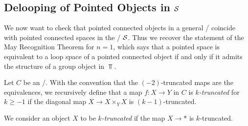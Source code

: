 \subsection*{Delooping of Pointed Objects in $\mathcal{S}$}
We now want to check that pointed connected objects in a general \inftytop/ coincide with pointed connected spaces in the \inftytop/ $\mathcal{S}$.
Thus we recover the statement of the May Recognition Theorem for $n=1$, which says that a pointed space is equivalent to a loop space of a pointed connected object if and only if it admits the structure of a group object in $\Top$. %
\begin{definition}
    Let $C$ be an \inftytop/.
    With the convention that the $(-2)$-truncated maps are the equivalences, we recursively define that a map $f\colon X\to Y$ in $C$ is \emph{$k$-truncated} for $k\geq -1$ if the diagonal map $X\to X\times_YX$ is $(k-1)$-truncated.
    
    We consider an object $X$ to be \emph{$k$-truncated} if the map $X\to *$ is $k$-truncated.
\end{definition}
